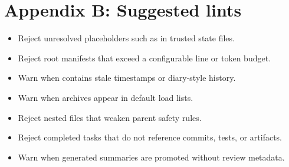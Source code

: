 
\section{Appendix B: Suggested lints}

\begin{itemize}
  \item Reject unresolved placeholders such as  in trusted state files.
  \item Reject root manifests that exceed a configurable line or token budget.
  \item Warn when  contains stale timestamps or diary-style history.
  \item Warn when archives appear in default load lists.
  \item Reject nested files that weaken parent safety rules.
  \item Reject completed tasks that do not reference commits, tests, or artifacts.
  \item Warn when generated summaries are promoted without review metadata.
\end{itemize}
